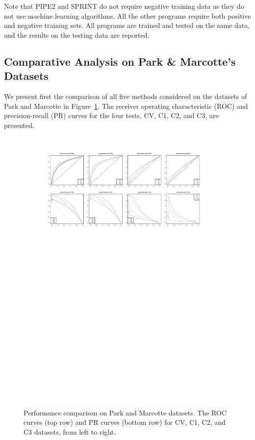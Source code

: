 Note that PIPE2 and SPRINT do not require negative training data as they do not use machine learning algorithms. All the other programs require both positive and negative training sets. All programs are trained and tested on the same data, and the results on the testing data are reported. 

\subsection{Comparative Analysis on Park \& Marcotte’s Datasets}
We present first the comparison of all five methods considered on the datasets of Park and Marcotte in Figure~\ref{fig_Park_Marcotte_curves}. The receiver operating characteristic (ROC) and precision-recall (PR) curves for the four tests, CV, C1, C2, and C3, are presented. 

\begin{figure}[h!]
\centering
\includegraphics{img/fig_PM_plots.pdf}
  \caption[Performance comparison on Park and Marcotte datasets.]{Performance comparison on Park and Marcotte datasets. The ROC curves (top row) and PR curves (bottom row) for CV, C1, C2, and C3 datasets, from left to right. \label{fig_Park_Marcotte_curves}}
\end{figure}

